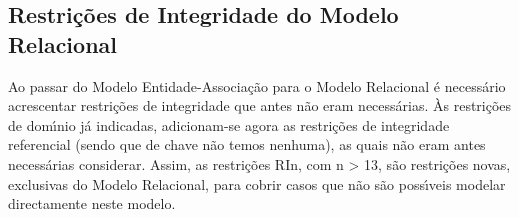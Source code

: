 \documentclass[11pt,a4paper]{article}
\begin{document}
\newpage

\subsection{Restri\c{c}\~oes de Integridade do Modelo Relacional}

Ao passar do Modelo Entidade-Associa\c{c}\~{a}o para o Modelo Relacional \'{e} necess\'{a}rio
acrescentar restri\c{c}\~{o}es de integridade que antes n\~{a}o eram necess\'{a}rias. \`{A}s
restri\c{c}\~{o}es de dom\'{\i}nio j\'{a} indicadas, adicionam-se agora as restri\c{c}\~{o}es de
integridade referencial (sendo que de chave n\~{a}o temos nenhuma), as quais n\~{a}o
eram antes necess\'{a}rias considerar. Assim, as restri\c{c}\~{o}es RIn, com n \textgreater{} 13, s\~{a}o
restri\c{c}\~{o}es novas, exclusivas do Modelo Relacional, para cobrir casos que n\~{a}o s\~{a}o
poss\'{\i}veis modelar directamente neste modelo.
\end{document}
